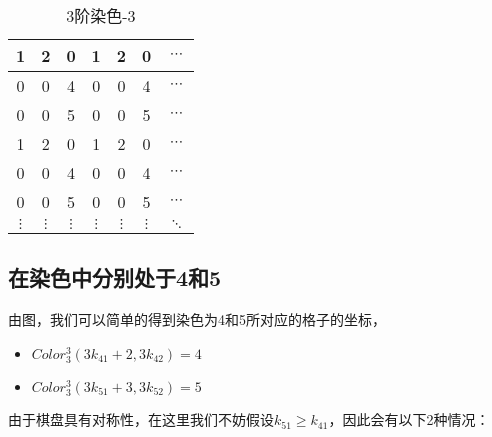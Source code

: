 \begin{table}[htbp]
	\centering
	\caption{3阶染色-3}
	\begin{tabular}{|c|c|c|c|c|c|c|}
		\hline
		1        & 2        & 0        & 1        & 2        & 0        & $\cdots$ \\
		\hline
		0        & 0        & 4        & 0        & 0        & 4        & $\cdots$ \\
		\hline
		0        & 0        & 5        & 0        & 0        & 5        & $\cdots$ \\
		\hline
		1        & 2        & 0        & 1        & 2        & 0        & $\cdots$ \\
		\hline
		0        & 0        & 4        & 0        & 0        & 4        & $\cdots$ \\
		\hline
		0        & 0        & 5        & 0        & 0        & 5        & $\cdots$ \\
		\hline
		$\vdots$ & $\vdots$ & $\vdots$ & $\vdots$ & $\vdots$ & $\vdots$ & $\ddots$ \\
		\hline
	\end{tabular}
	\label{fig:3-order-staining-last}
\end{table}

\subsection{在染色中分别处于4和5}

由图，我们可以简单的得到染色为4和5所对应的格子的坐标，

\begin{itemize}
	\item $Color^3_3(3k_{41} + 2, 3k_{42}) = 4$
	\item $Color^3_3(3k_{51} + 3, 3k_{52}) = 5$
\end{itemize}

由于棋盘具有对称性，在这里我们不妨假设$k_{51} \ge k_{41}$，因此会有以下2种情况：



